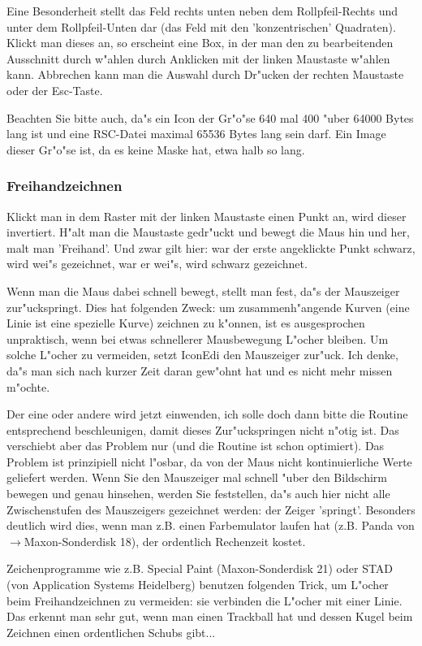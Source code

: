 Eine Besonderheit stellt das Feld rechts unten neben dem 
Rollpfeil-Rechts und unter dem Rollpfeil-Unten dar (das 
Feld mit den 'konzentrischen' Quadraten). Klickt man dieses an, 
so erscheint eine Box, in der man den zu bearbeitenden Ausschnitt 
durch w"ahlen durch Anklicken mit der linken Maustaste w"ahlen 
kann. Abbrechen kann man die Auswahl durch Dr"ucken der rechten 
Maustaste oder der Esc-Taste.

Beachten Sie bitte auch, da"s ein Icon der Gr"o"se 640 mal 400 
"uber 64000 Bytes lang ist und eine RSC-Datei maximal 65536 Bytes
lang sein darf. Ein Image dieser Gr"o"se ist, da es keine Maske
hat, etwa halb so lang. 

\subsubsection{Freihandzeichnen} 
Klickt man in dem Raster mit der linken Maustaste einen Punkt an, 
wird dieser invertiert. H"alt man die Maustaste gedr"uckt und 
bewegt die Maus hin und her, malt man 'Freihand'. Und zwar gilt 
hier: war der erste angeklickte Punkt schwarz, wird wei"s 
gezeichnet, war er wei"s, wird schwarz gezeichnet. 

Wenn man die Maus dabei schnell bewegt, stellt man fest, da"s der 
Mauszeiger zur"uckspringt. Dies hat folgenden Zweck: um 
zusammenh"angende Kurven (eine Linie ist eine spezielle Kurve) 
zeichnen zu k"onnen, ist es ausgesprochen unpraktisch, wenn bei 
etwas schnellerer Mausbewegung L"ocher bleiben. Um solche L"ocher 
zu vermeiden, setzt IconEdi den Mauszeiger zur"uck. Ich denke, da"s 
man sich nach kurzer Zeit daran gew"ohnt hat und es nicht mehr 
missen m"ochte.

Der eine oder andere wird jetzt einwenden, ich solle doch dann 
bitte die Routine entsprechend beschleunigen, damit dieses 
Zur"uckspringen nicht n"otig ist. Das verschiebt aber das Problem 
nur (und die Routine ist schon optimiert). Das Problem ist 
prinzipiell nicht l"osbar, da von der Maus nicht kontinuierliche 
Werte geliefert werden. Wenn Sie den Mauszeiger mal schnell "uber 
den Bildschirm bewegen und genau hinsehen, werden Sie feststellen, 
da"s auch hier nicht alle Zwischenstufen des Mauszeigers gezeichnet 
werden: der Zeiger 'springt'. Besonders deutlich wird dies, wenn 
man z.B. einen Farbemulator laufen hat (z.B. Panda von 
$\to$Maxon-Sonderdisk  18), der 
ordentlich Rechenzeit kostet.

Zeichenprogramme wie z.B. Special Paint (Maxon-Sonderdisk 21) 
oder STAD (von Application Systems Heidelberg) benutzen folgenden 
Trick, um L"ocher beim Freihandzeichnen zu vermeiden: sie verbinden 
die L"ocher mit einer Linie. Das erkennt man sehr gut, wenn man 
einen Trackball hat und dessen Kugel 
beim Zeichnen einen ordentlichen Schubs gibt...

